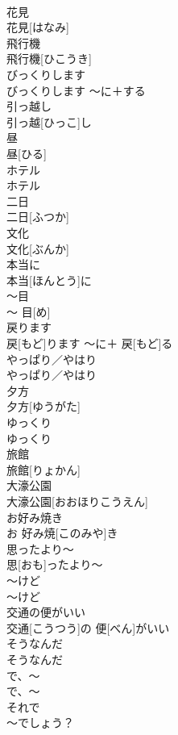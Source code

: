 \documentclass[8pt]{extreport}
\begin{document}
\begin{CJK}{UTF8}{min}
\\	花見	
\\	花見[はなみ]		
\\	飛行機	
\\	飛行機[ひこうき]		
\\	びっくりします	
\\	びっくりします	〜に＋する	
\\	引っ越し	
\\	引っ越[ひっこ]し		
\\	昼	
\\	昼[ひる]		
\\	ホテル	
\\	ホテル		
\\	二日	
\\	二日[ふつか]		
\\	文化	
\\	文化[ぶんか]		
\\	本当に	
\\	本当[ほんとう]に		
\\	〜目	
\\	〜 目[め]		
\\	戻ります	
\\	戻[もど]ります	〜に＋ 戻[もど]る	
\\	やっぱり／やはり	
\\	やっぱり／やはり		
\\	夕方	
\\	夕方[ゆうがた]		
\\	ゆっくり	
\\	ゆっくり		
\\	旅館	
\\	旅館[りょかん]		
\\	大濠公園	
\\	大濠公園[おおほりこうえん]		
\\	お好み焼き	
\\	お 好み焼[このみや]き		
\\	思ったより〜	
\\	思[おも]ったより〜		
\\	〜けど	
\\	〜けど		
\\	交通の便がいい	
\\	交通[こうつう]の 便[べん]がいい		
\\	そうなんだ	
\\	そうなんだ		
\\	で、〜	
\\	で、〜	
\\	それで 
\\	〜でしょう？	

\end{CJK}
\end{document}
